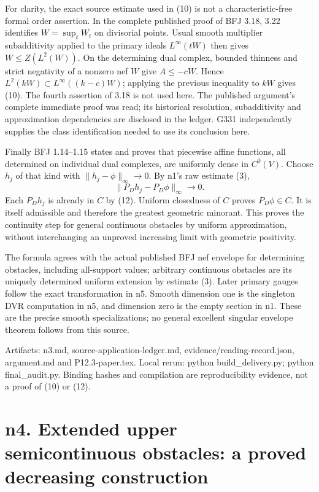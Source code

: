 \documentclass[11pt]{article}
\begin{document}
For clarity, the exact source estimate used in (10) is not a characteristic-free formal order assertion. In the complete published proof of BFJ 3.18, 3.22 identifies \(W=\sup_t W_t\) on divisorial points. Usual smooth multiplier subadditivity applied to the primary ideals \(L^\infty(tW)\) then gives \(W\le Z(L^2(W))\). On the determining dual complex, bounded thinness and strict negativity of a nonzero nef \(W\) give \(A\le-cW\). Hence \(L^2(kW)\subset L^\infty((k-c)W)\); applying the previous inequality to \(kW\) gives (10). The fourth assertion of 3.18 is not used here. The published argument's complete immediate proof was read; its historical resolution, subadditivity and approximation dependencies are disclosed in the ledger. G331 independently supplies the class identification needed to use its conclusion here.

Finally BFJ 1.14--1.15 states and proves that piecewise affine functions, all determined on individual dual complexes, are uniformly dense in \(C^0(V)\). Choose \(h_j\) of that kind with \(\|h_j-\phi\|_\infty\to0\). By n1's raw estimate (3),
\[
\|P_Dh_j-P_D\phi\|_\infty\to0.
\]
Each \(P_Dh_j\) is already in \(C\) by (12). Uniform closedness of \(C\) proves \(P_D\phi\in C\). It is itself admissible and therefore the greatest geometric minorant. This proves the continuity step for general continuous obstacles by uniform approximation, without interchanging an unproved increasing limit with geometric positivity.

The formula agrees with the actual published BFJ nef envelope for determining obstacles, including all-support values; arbitrary continuous obstacles are its uniquely determined uniform extension by estimate (3). Later primary gauges follow the exact transformation in n5. Smooth dimension one is the singleton DVR computation in n5, and dimension zero is the empty section in n1. These are the precise smooth specializations; no general excellent singular envelope theorem follows from this source.

Artifacts: n3.md, source-application-ledger.md, evidence/reading-record.json, argument.md and P12.3-paper.tex. Local rerun: python build\_delivery.py; python final\_audit.py. Binding hashes and compilation are reproducibility evidence, not a proof of (10) or (12).

\section{n4. Extended upper semicontinuous obstacles: a proved decreasing construction}
\end{document}
